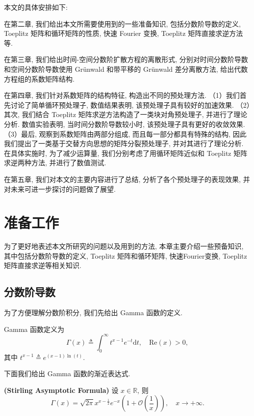 \documentclass{ecnumaster}
\begin{document}
本文的具体安排如下:


在第二章, 我们给出本文所需要使用到的一些准备知识,
包括分数阶导数的定义, Toeplitz 矩阵和循环矩阵的性质,
快速 Fourier 变换, Toeplitz 矩阵直接求逆方法等.

在第三章, 我们给出时间-空间分数阶扩散方程的离散形式,
分别对时间分数阶导数和空间分数阶导数使用 Gr\"unwald 和带平移的 Gr\"unwald 差分离散方法,
给出代数方程组的系数矩阵结构.

在第四章, 我们针对系数矩阵的结构特征, 构造出不同的预处理方法.
（1）我们首先讨论了简单循环预处理子, 数值结果表明, 该预处理子具有较好的加速效果.
（2）其次, 我们结合 Toeplitz 矩阵求逆方法构造了一类块对角预处理子, 并进行了理论分析.
数值实验表明, 当时间分数阶导数较小时, 该预处理子具有更好的收敛效果.
（3）最后, 观察到系数矩阵由两部分组成, 而且每一部分都具有特殊的结构,
因此我们提出了一类基于交替方向思想的矩阵分裂预处理子, 并对其进行了理论分析.
在具体实施时, 为了减少运算量, 我们分别考虑了用循环矩阵近似和
Toeplitz 矩阵求逆两种方法, 并进行了数值测试.

在第五章, 我们对本文的主要内容进行了总结, 
分析了各个预处理子的表现效果, 
并对未来可进一步探讨的问题做了展望.



\chapter{准备工作}
为了更好地表述本文所研究的问题以及用到的方法,
本章主要介绍一些预备知识,
其中包括分数阶导数的定义, Toeplitz 矩阵和循环矩阵,
快速Fourier变换, Toeplitz 矩阵直接求逆等相关知识.

\section{分数阶导数}
为了方便理解分数阶积分, 我们先给出 Gamma 函数的定义.
\begin{definition}\label{def21}
Gamma 函数定义为
\begin{equation}\nonumber
  \Gamma(x) \triangleq \int_0^{\infty}t^{x - 1}e^{-t}\mathrm{d}t, \quad \mathrm{Re}(x) > 0,
\end{equation}
其中 $t^{x - 1} \triangleq e^{(x - 1)\ln (t)}.$
\end{definition}

下面我们给出 Gamma 函数的渐近表达式.
\begin{theorem}\label{thgamma1}
  \textbf{(Stirling Asymptotic Formula)} 设 $x \in \mathbb{R}$, 则
  \begin{equation}\nonumber
  \Gamma (x) = \sqrt{2 \pi} x^{x- \frac{1}{2}} e^{-x} \left(1 + \mathcal{O} \left(\frac{1}{x}\right)\right), \quad x \to +\infty.
  \end{equation}
\end{theorem}
\end{document}
